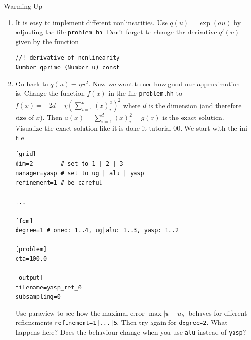 \documentclass[12pt,a4paper]{article}
\begin{document}
\begin{Exercise}{Warming Up}
\begin{enumerate}
\begin{lstlisting}
[output]
filename=degree1_subsampling0
subsampling=0
\end{lstlisting}
    Try all combinations of \lstinline{degree=1|2} and
    \lstinline{subsampling=1|2} with appropriate
    \lstinline{filename}.  Look at your solutions using paraview and the
    \lstinline{warp by scalar} filter.  You can see the underlying grid
    by choosing \lstinline{surface with edges} instead of
    \lstinline{surface} in the parview drop down menu.  How does
    subsampling change the output?

  \item It is easy to implement different nonlinearities.  Use
    $q(u)=\exp(au)$ by adjusting the file \lstinline{problem.hh}.
    Don't forget to change the derivative $q'(u)$ given by the
    function
    \begin{lstlisting}
//! derivative of nonlinearity
Number qprime (Number u) const
    \end{lstlisting}

  \item Go back to $q(u)=\eta u^2$.  Now we want to see how good our
    approximation is.  Change the function $f(x)$ in the file
    \lstinline{problem.hh} to $f(x)=-2d+\eta(\sum_{i=1}^d(x)_i^2)^2$
    where $d$ is the dimension (and therefore size of $x$).  Then
    $u(x)=\sum_{i=1}^d(x)_i^2=g(x)$ is the exact solution.  Visualize the
    exact solution like it is done it tutorial 00. We start with the
    ini file
    \begin{lstlisting}
[grid]
dim=2        # set to 1 | 2 | 3
manager=yasp # set to ug | alu | yasp
refinement=1 # be careful

...

[fem]
degree=1 # oned: 1..4, ug|alu: 1..3, yasp: 1..2

[problem]
eta=100.0

[output]
filename=yasp_ref_0
subsampling=0
    \end{lstlisting}
    Use paraview to see how the maximal error $\max|u-u_h|$ behaves
    for diferent refienements \lstinline{refinement=1|...|5}.  Then
    try again for \lstinline{degree=2}.  What happens here?  Does the
    behaviour change when you use \lstinline{alu} instead of
    \lstinline{yasp}?
  \end{enumerate}
\end{Exercise}
\end{document}
